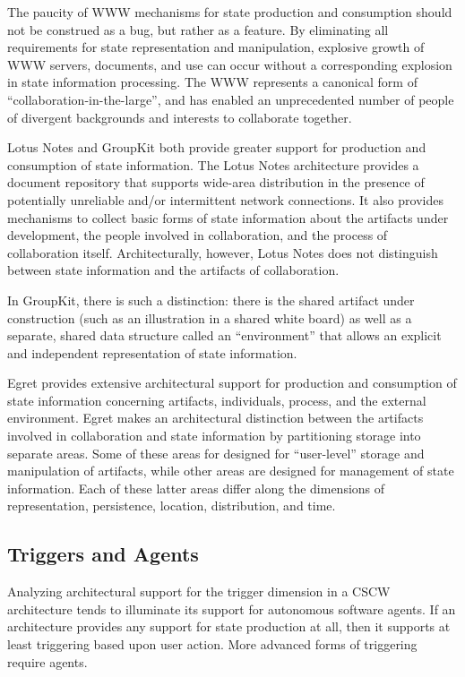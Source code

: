 The paucity of WWW mechanisms for state production and consumption should
not be construed as a bug, but rather as a feature. By eliminating all
requirements for state representation and manipulation, explosive growth of
WWW servers, documents, and use can occur without a corresponding explosion
in state information processing.  The WWW represents a canonical form of
``collaboration-in-the-large'', and has enabled an unprecedented number of
people of divergent backgrounds and interests to collaborate 
together. 

Lotus Notes and GroupKit both provide greater support for production and
consumption of state information.  The Lotus Notes architecture
provides a document repository that supports wide-area distribution in
the presence of potentially unreliable and/or intermittent network
connections.  It also provides mechanisms to collect basic forms of
state information about the artifacts under development, the people
involved in collaboration, and the process of collaboration itself.
Architecturally, however, Lotus Notes does not distinguish between state
information and the artifacts of collaboration.

In GroupKit, there is such a distinction: there is the shared artifact
under construction (such as an illustration in a shared white board) as well
as a separate, shared data structure called an ``environment'' that allows
an explicit and independent representation of state information.

Egret provides extensive architectural support for production and
consumption of state information concerning artifacts, individuals,
process, and the external environment.  Egret makes an architectural
distinction between the artifacts involved in collaboration and state
information by partitioning storage into separate areas. Some of these
areas for designed for ``user-level'' storage and manipulation of
artifacts, while other areas are designed for management of state
information.  Each of these latter areas differ along the dimensions of
representation, persistence, location, distribution, and time.

\subsection{Triggers and Agents}

Analyzing architectural support for the trigger dimension in a
CSCW architecture tends to illuminate its support for autonomous
software agents.  If an architecture provides any support for state
production at all, then it supports at least triggering based upon 
user action. More advanced forms of triggering require agents. 

